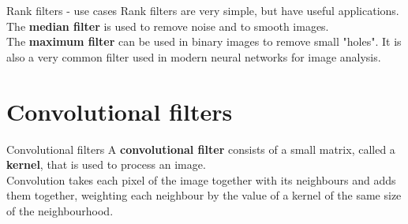 \documentclass[9pt, aspectratio=169]{beamer}
\begin{document}
\begin{frame}
    {Rank filters - use cases}
    Rank filters are very simple, but have useful applications.\\

    The \textbf{median filter} is used to remove noise and to smooth images.\\
    \pause
    \vspace{1em}
    The \textbf{maximum filter} can be used in binary images to remove  small "holes". It is also a very common filter used in modern neural networks for image analysis.\\
\end{frame}

\section{Convolutional filters}

\begin{frame}
    {Convolutional filters}
    A \textbf{convolutional filter} consists of a small matrix, called a \textbf{kernel}, that is used to process an image.\\

    Convolution takes each pixel of the image together with its neighbours and adds them together, weighting each neighbour by the value of a kernel of the same size of the neighbourhood.

\end{frame}
\end{document}
